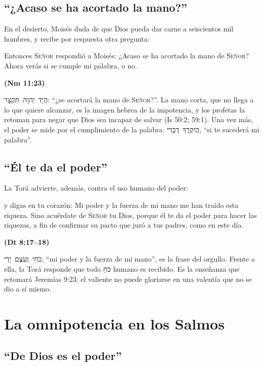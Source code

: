 \documentclass[11pt,letterpaper]{article}
\newcommand{\heb}[1]{\mbox{\foreignlanguage{hebrew}{#1}}}
\newcommand{\SENOR}{\textsc{Señor}}
\newcommand{\fuente}[1]{\par\hfill{\upshape\bfseries\small\textcolor{azul}{#1}}}
\begin{document}
\subsection{``¿Acaso se ha acortado la mano?''}

En el desierto, Moisés duda de que Dios pueda dar carne a seiscientos mil hombres, y recibe por respuesta otra pregunta:

\begin{cita}Entonces \SENOR{} respondió a Moisés: ¿Acaso se ha acortado la mano de \SENOR? Ahora verás si se cumple mi palabra, o no.\fuente{(Nm 11:23)}\end{cita}

\heb{הֲיַד יְהוָה תִּקְצָר}: ``¿se acortará la mano de \SENOR?''. La mano corta, que no llega a lo que quiere alcanzar, es la imagen hebrea de la impotencia, y los profetas la retoman para negar que Dios sea incapaz de salvar (Is 50:2; 59:1). Una vez más, el poder se mide por el cumplimiento de la palabra: \heb{הֲיִקְרְךָ דְבָרִי}, ``si te sucederá mi palabra''.

\subsection{``Él te da el poder''}

La Torá advierte, además, contra el uso humano del poder:

\begin{cita}y digas en tu corazón: Mi poder y la fuerza de mi mano me han traído esta riqueza. Sino acuérdate de \SENOR{} tu Dios, porque él te da el poder para hacer las riquezas, a fin de confirmar su pacto que juró a tus padres, como en este día.\fuente{(Dt 8:17--18)}\end{cita}

\heb{כֹּחִי וְעֹצֶם יָדִי}, ``mi poder y la fuerza de mi mano'', es la frase del orgullo. Frente a ella, la Torá responde que todo \heb{כֹּחַ} humano es recibido. Es la enseñanza que retomará Jeremías 9:23: el valiente no puede gloriarse en una valentía que no se dio a sí mismo.

\section{La omnipotencia en los Salmos}

\subsection{``De Dios es el poder''}
\end{document}
